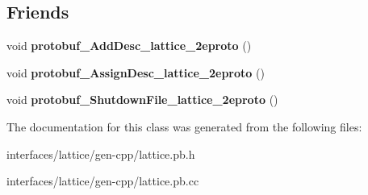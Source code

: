 \subsection*{Friends}
\begin{DoxyCompactItemize}
\item 
\hypertarget{classlattice_1_1Lattice__Edge_a19e63fb37025879e023cad88064187cf}{
void {\bfseries protobuf\_\-AddDesc\_\-lattice\_\-2eproto} ()}
\label{classlattice_1_1Lattice__Edge_a19e63fb37025879e023cad88064187cf}

\item 
\hypertarget{classlattice_1_1Lattice__Edge_a3b0386e09a9fefcf1bdce658cfc480b2}{
void {\bfseries protobuf\_\-AssignDesc\_\-lattice\_\-2eproto} ()}
\label{classlattice_1_1Lattice__Edge_a3b0386e09a9fefcf1bdce658cfc480b2}

\item 
\hypertarget{classlattice_1_1Lattice__Edge_a3c7b187721d0704ceb19ff889729d35a}{
void {\bfseries protobuf\_\-ShutdownFile\_\-lattice\_\-2eproto} ()}
\label{classlattice_1_1Lattice__Edge_a3c7b187721d0704ceb19ff889729d35a}

\end{DoxyCompactItemize}


The documentation for this class was generated from the following files:\begin{DoxyCompactItemize}
\item 
interfaces/lattice/gen-\/cpp/lattice.pb.h\item 
interfaces/lattice/gen-\/cpp/lattice.pb.cc\end{DoxyCompactItemize}
